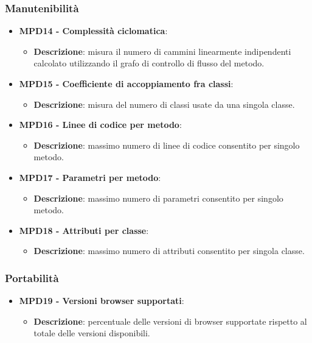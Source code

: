\documentclass[10pt]{article}
\begin{document}
\begin{justify}
\subsubsection{Manutenibilità}
\begin{itemize}
    \item \textbf{MPD14 - Complessità ciclomatica}:
    \begin{itemize}
        \item \textbf{Descrizione}: misura il numero di cammini linearmente indipendenti calcolato utilizzando il grafo di controllo di flusso del metodo.
    \end{itemize}
    \item \textbf{MPD15 - Coefficiente di accoppiamento fra classi}:
    \begin{itemize}
        \item \textbf{Descrizione}: misura del numero di classi usate da una singola classe.
    \end{itemize}
    \item \textbf{MPD16 - Linee di codice per metodo}:
      \begin{itemize}
        \item \textbf{Descrizione}: massimo numero di linee di codice consentito per singolo metodo.
      \end{itemize}
    \item \textbf{MPD17 - Parametri per metodo}:
      \begin{itemize}
        \item \textbf{Descrizione}: massimo numero di parametri consentito per singolo metodo.
      \end{itemize}
    \item \textbf{MPD18 - Attributi per classe}:
      \begin{itemize}
        \item \textbf{Descrizione}: massimo numero di attributi consentito per singola classe.
      \end{itemize}
\end{itemize}

\subsubsection{Portabilità}
  \begin{itemize}
    \item \textbf{MPD19 - Versioni browser supportati}:
      \begin{itemize}
        \item \textbf{Descrizione}: percentuale delle versioni di browser supportate rispetto al totale delle versioni disponibili.
      \end{itemize}
\end{itemize}


\end{justify}
\end{document}
